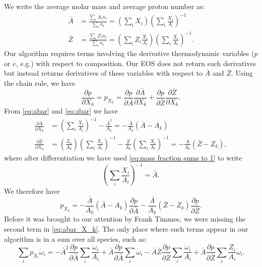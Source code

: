 \documentclass[11pt]{article}
\def\ptl   {\partial}
\begin{document}
  We write the average molar mass and average proton number as:
  \begin{align}\label{eq:abar}
    \bar{A} &= \frac{\sum_i A_i n_i}{\sum_i n_i} = \left(\sum_i X_i\right)
    \left(\sum_i \frac{X_i}{A_i}\right)^{-1}\\
    \label{eq:zbar}
    \bar{Z} &= \frac{\sum_i Z_i n_i}{\sum_i n_i} = \left(\sum_i Z_i
    \frac{X_i}{A_i}\right)\left(\sum_i \frac{X_i}{A_i}\right)^{-1}.
  \end{align}
  Our algorithm requires terms involving the derivative thermodynamic variables
  ($p$ or $e$, e.g.) with respect to composition.  Our EOS does not return such
  derivatives but instead returns derivatives of these variables with respect 
  to $\bar{A}$ and $\bar{Z}$.  Using the chain rule, we have
  \begin{equation}\label{eq:p_xk}
    \frac{\ptl p}{\ptl X_k} = p_{X_k} = 
    \frac{\ptl p}{\ptl \bar{A}}\frac{\ptl \bar{A}}{\ptl X_k} + 
    \frac{\ptl p}{\ptl \bar{Z}}\frac{\ptl \bar{Z}}{\ptl X_k}.
  \end{equation}
  From \eqref{eq:abar} and \eqref{eq:zbar} we have
  \begin{align}\label{eq:abar_X_k}
    \frac{\ptl \bar{A}}{\ptl X_k} &= \left(\sum_i \frac{X_i}{A_i}\right)^{-1}
    - \frac{\bar{A}^2}{A_k} = -\frac{\bar{A}}{A_k}\left(\bar{A} - A_k\right)\\
    \label{eq:zbar_X_k}
    \frac{\ptl \bar{Z}}{\ptl X_k} &= 
    \left(\frac{Z_k}{A_k}\right)\left(\sum_i \frac{X_i}{A_i}\right)^{-1}
    - \frac{\bar{Z}}{A_k}\left(\sum_i \frac{X_i}{A_i}\right)^{-1} = 
    -\frac{\bar{A}}{A_k}\left(\bar{Z} - Z_k\right),
  \end{align}
  where after differentiation we have used \eqref{eq:mass fraction sums to 1}
  to write
  \[
  \left(\sum_i \frac{X_i}{A_i}\right)^{-1} = \bar{A}.
  \]
  We therefore have
  \begin{equation}\label{eq:p_Xk_full}
    p_{X_k} = -\frac{\bar{A}}{A_k}\left(\bar{A} - A_k\right)
    \frac{\ptl p}{\ptl\bar{A}} - \frac{\bar{A}}{A_k}\left(\bar{Z} - Z_k\right)
    \frac{\ptl p}{\ptl\bar{Z}}.
  \end{equation}
  Before it was brought to our attention by Frank Timmes, we were missing the
  second term in \eqref{eq:abar_X_k}.  The only place where such terms 
  appear in our algorithm is in a sum over all species, such as:
  \begin{equation}\label{eq:sum over species}
    \sum_i p_{X_i}\dot{\omega}_i = 
    -\bar{A}^2\frac{\ptl p}{\ptl\bar{A}}\sum_i \frac{\dot{\omega}_i}{A_i}
    +\bar{A}\frac{\ptl p}{\ptl\bar{A}}\sum_i \dot{\omega}_i
    -\bar{A}\bar{Z}\frac{\ptl p}{\ptl\bar{Z}}\sum_i \frac{\dot{\omega}_i}{A_i}
    +\bar{A}\frac{\ptl p}{\ptl \bar{Z}}\sum_i\frac{Z_i}{A_i}\dot{\omega}_i.
  \end{equation}
\end{document}
